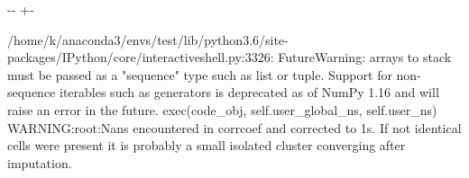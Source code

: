 \documentclass[letterpaper,10pt,english]{sphinxmanual}
\newlength\nbsphinxcodecellspacing
\begin{document}
{
%
\begin{sphinxVerbatim}[commandchars=\\\{\}]
\llap{\color{nbsphinxin}[35]:\,\hspace{\fboxrule}\hspace{\fboxsep}}
  

  

   
\end{sphinxVerbatim}
}



%
{
\kern-\sphinxverbatimsmallskipamount\kern-\baselineskip
\kern+\FrameHeightAdjust\kern-\fboxrule
\vspace{\nbsphinxcodecellspacing}
%
\begin{sphinxVerbatim}[commandchars=\\\{\}]
/home/k/anaconda3/envs/test/lib/python3.6/site-packages/IPython/core/interactiveshell.py:3326: FutureWarning: arrays to stack must be passed as a "sequence" type such as list or tuple. Support for non-sequence iterables such as generators is deprecated as of NumPy 1.16 and will raise an error in the future.
  exec(code\_obj, self.user\_global\_ns, self.user\_ns)
WARNING:root:Nans encountered in corrcoef and corrected to 1s. If not identical cells were present it is probably a small isolated cluster converging after imputation.
\end{sphinxVerbatim}
}
\relax
\end{document}
